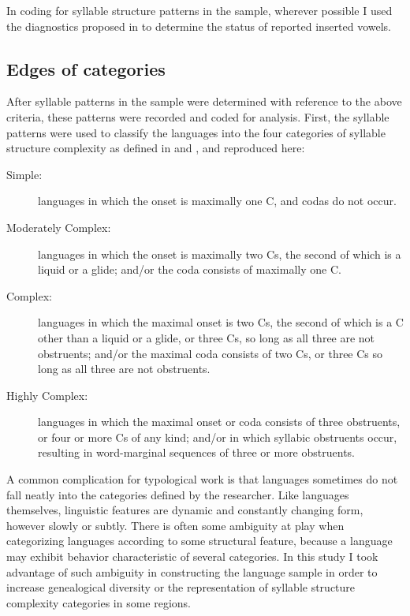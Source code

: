 In coding for syllable structure patterns in the sample, wherever possible I used the diagnostics proposed in \citet{Hall2006} to determine the status of reported inserted vowels.

\subsection{Edges of categories}\label{sec:3.2.3}

  After syllable patterns in the sample were determined with reference to the above criteria, these patterns were recorded and coded for analysis. First, the syllable patterns were used to classify the languages into the four categories of syllable structure complexity as defined in \citet{Maddieson2013a} and , and reproduced here:

\begin{description}
\item[Simple:] languages in which the onset is maximally one C, and codas do not occur.
\item[Moderately Complex:] languages in which the onset is maximally two Cs, the second of which is a liquid or a glide; and/or the coda consists of maximally one C.
\item[Complex:] languages in which the maximal onset is two Cs, the second of which is a C other than a liquid or a glide, or three Cs, so long as all three are not obstruents; and/or the maximal coda consists of two Cs, or three Cs so long as all three are not obstruents.
\item[Highly Complex:] languages in which the maximal onset or coda consists of three obstruents, or four or more Cs of any kind; and/or in which syllabic obstruents occur, resulting in word-marginal sequences of three or more obstruents.
\end{description}

  A common complication for typological work is that languages sometimes do not fall neatly into the categories defined by the researcher. Like languages themselves, linguistic features are dynamic and constantly changing form, however slowly or subtly. There is often some ambiguity at play when categorizing languages according to some structural feature, because a language may exhibit behavior characteristic of several categories. In this study I took advantage of such ambiguity in constructing the language sample in order to increase genealogical diversity or the representation of syllable structure complexity categories in some regions.

